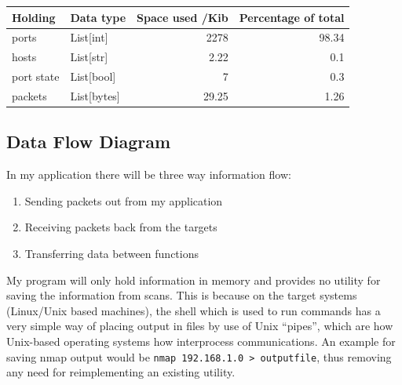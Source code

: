 \documentclass[titlepage]{article}
\let\Oldsubsection\subsection{}
\renewcommand{\subsection}{\FloatBarrier\Oldsubsection}
\begin{document}
\begin{center}
  \begin{tabular}{p{3cm} l r r}
    \toprule
    Holding    & Data type   & Space used /Kib & Percentage of total \\
    \midrule
    ports      & List[int]   & 2278            & 98.34 \\
    hosts      & List[str]   & 2.22            & 0.1   \\
    port state & List[bool]  & 7               & 0.3   \\
    packets    & List[bytes] & 29.25           & 1.26  \\
    \bottomrule
  \end{tabular}
\end{center}

\subsection{Data Flow Diagram}

In my application there will be three way information flow: 
\begin{enumerate}
  \item{Sending packets out from my application}
  \item{Receiving packets back from the targets}
  \item{Transferring data between functions}
\end{enumerate}
My program will only hold information in memory and provides no utility
for saving the information from scans. This is because on the target systems
(Linux/Unix based machines), the shell which is used to run commands has
a very simple way of placing output in files by use of
Unix ``pipes'', which are how Unix-based operating systems how interprocess
communications. An example for saving nmap output would be
\verb|nmap 192.168.1.0 > outputfile|, thus
removing any need for reimplementing an existing utility.
\end{document}
